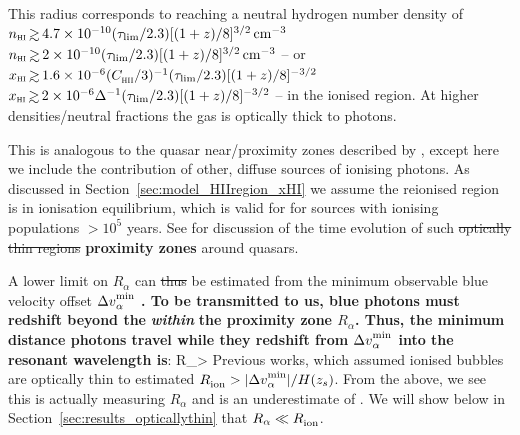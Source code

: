 \documentclass[fleqn,usenatbib]{mnras}
\providecommand{\DIFadd}[1]{{\protect\color{Green} {\bf #1}}} %
\providecommand{\DIFdel}[1]{{\protect\color{Gray} \scriptsize \sout{#1}}} %
\providecommand{\DIFaddbegin}{} %
\providecommand{\DIFaddend}{} %
\providecommand{\DIFdelbegin}{} %
\providecommand{\DIFdelend}{} %
\newcommand{\DIFscaledelfig}{0.5}
\newlength{\DIFdelgraphicswidth} %
\newlength{\DIFdelgraphicsheight} %
\newcommand{\DIFaddincludegraphics}[2][]{{\color{purple}\fbox{\DIFOincludegraphics[#1]{#2}}}} %
\newcommand{\DIFdelincludegraphics}[2][]{%
\sbox{\DIFdelgraphicsbox}{\DIFOincludegraphics[#1]{#2}}%
\settoboxwidth{\DIFdelgraphicswidth}{\DIFdelgraphicsbox} %
\settoboxtotalheight{\DIFdelgraphicsheight}{\DIFdelgraphicsbox} %
\scalebox{\DIFscaledelfig}{%
\parbox[b]{\DIFdelgraphicswidth}{\usebox{\DIFdelgraphicsbox}\\[-\baselineskip] \rule{\DIFdelgraphicswidth}{0em}}\llap{\resizebox{\DIFdelgraphicswidth}{\DIFdelgraphicsheight}{%
\setlength{\unitlength}{\DIFdelgraphicswidth}%
\begin{picture}(1,1)%
\thicklines\linethickness{2pt} %
{\color[rgb]{1,0,0}\put(0,0){\framebox(1,1){}}}%
{\color[rgb]{1,0,0}\put(0,0){\line( 1,1){1}}}%
{\color[rgb]{1,0,0}\put(0,1){\line(1,-1){1}}}%
\end{picture}%
}\hspace*{3pt}}} %
} %
\DeclareRobustCommand{\DIFaddbegin}{\DIFOaddbegin \let\includegraphics\DIFaddincludegraphics} %
\DeclareRobustCommand{\DIFaddend}{\DIFOaddend \let\includegraphics\DIFOincludegraphics} %
\DeclareRobustCommand{\DIFdelbegin}{\DIFOdelbegin \let\includegraphics\DIFdelincludegraphics} %
\DeclareRobustCommand{\DIFdelend}{\DIFOaddend \let\includegraphics\DIFOincludegraphics} %
\begin{document}
This radius corresponds to reaching a neutral hydrogen number density of \DIFdelbegin \DIFdel{$n_\HI \simgt 4.7\times10^{-10} (\tau_\mathrm{lim}/2.3)[(1+z)/8]^{3/2}\cm^{-3}$ }\DIFdelend \DIFaddbegin \DIFadd{$n_\HI \simgt 2\times10^{-10} (\tau_\mathrm{lim}/2.3)[(1+z)/8]^{3/2}\cm^{-3}$ }\DIFaddend -- or \DIFdelbegin \DIFdel{$\xHI \simgt 1.6\times10^{-6} (\clump/3)^{-1} (\tau_\mathrm{lim}/2.3)[(1+z)/8]^{-3/2}$ }\DIFdelend \DIFaddbegin \DIFadd{$\xHI \simgt 2\times10^{-6} \Delta^{-1} (\tau_\mathrm{lim}/2.3)[(1+z)/8]^{-3/2}$ }\DIFaddend -- in the ionised region. At higher densities/neutral fractions the gas is optically thick to \lya photons.

This is analogous to the quasar near/proximity zones described by \citet{bolton2007c}, except here we include the contribution of other, diffuse sources of ionising photons. As discussed in Section~\ref{sec:model_HIIregion_xHI} we assume the reionised region is in ionisation equilibrium, which is valid for for sources with ionising populations $>10^5$ years. See \citet{Davies2019} for discussion of the time evolution of such \DIFdelbegin \DIFdel{optically thin regions }\DIFdelend \DIFaddbegin \DIFadd{proximity zones }\DIFaddend around quasars.

A lower limit on $R_\alpha$ can \DIFdelbegin \DIFdel{thus }\DIFdelend be estimated from the minimum observable blue \lya velocity offset $\DV^\mathrm{min}_\alpha$\DIFaddbegin \DIFadd{. To be transmitted to us, blue photons must redshift beyond the }\lya\DIFadd{\ resonant wavelength (i.e. $\DV_\alpha = 0$) }\textit{\DIFadd{within}} \DIFadd{the proximity zone $R_\alpha$. Thus, the minimum distance photons travel while they redshift from $\DV^\mathrm{min}_\alpha$ into the resonant wavelength is}\DIFaddend :
%
\BE \label{eqn:opticallythin_DV}
R_\alpha > 
\EE
%
Previous works, which assumed ionised bubbles are optically thin to \lya \citep[e.g.,][]{Matthee2018b,Hashimoto2018a} estimated $\Rion > |\DV^\mathrm{min}_\alpha|/H(z_s)$. From the above, we see this is actually measuring $R_\alpha$ and is an underestimate of \Rion. We will show below in Section~\ref{sec:results_opticallythin} that $R_\alpha \ll \Rion$. 

\end{document}
